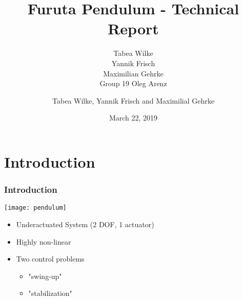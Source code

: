 \documentclass[accentcolor=tud1d,colorbacktitle,inverttitle,landscape,german,presentation,t]{tudbeamer}
\begin{document}
	
	\title[Furuta Pendulum]{Furuta Pendulum - Technical Report}
	\subtitle{Tabea Wilke\\Yannik Frisch\\Maximilian Gehrke \\Group 19 Oleg 
	Arenz}
	
	\author[Tabea Wilke et al.]{Tabea Wilke, Yannik Frisch and Maximilial 
	Gehrke}
	
	
	
	\date{March 22, 2019}
	

\begin{titleframe}
\end{titleframe}
\section{Introduction}
	\begin{frame}
		\frametitle{Introduction}
	
	\begin{minipage}{0.45\textwidth}
		\texttt{[image: pendulum]}
		\cite{la2009new}	
		\end{minipage}
		\begin{minipage}{0.5\textwidth}
			\begin{itemize}
				\item Underactuated System (2 DOF, 1 actuator)
				\item Highly non-linear
				\item Two control problems
				\begin{itemize}
					\item "swing-up"
					\item "stabilization"
				\end{itemize}
			\end{itemize}
		\end{minipage}

	\end{frame}
\end{document}
